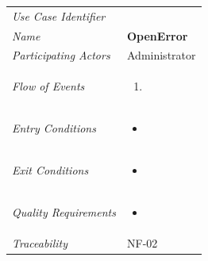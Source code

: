 \documentclass[12pt,letterpaper]{article}
\begin{document}
\begin{center}
	\begin{tabu} to 
		\toprule
		Use Case Identifier & \openerror{} \\
		Name & {\bf OpenError} \\
		Participating Actors & Administrator \\
		Flow of Events & 
	    \begin{enumerate}[topsep=-1em,leftmargin=*]
		    \item 
		\end{enumerate} \\

		Entry Conditions &
		\begin{itemize}[topsep=-1em,leftmargin=*]
		    \item 
        \end{itemize} \\

		Exit Conditions &
		\begin{itemize}[topsep=-1em,leftmargin=*]
		    \item 
        \end{itemize} \\

		Quality Requirements &
		\begin{itemize}[topsep=-1em,leftmargin=*]
		    \item 
        \end{itemize} \\

		Traceability & NF-02 \\
		\toprule
	\end{tabu}
\end{center}
\end{document}
